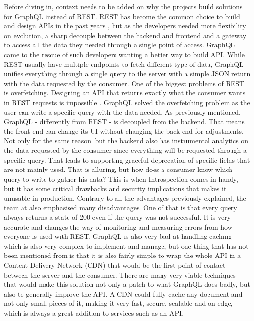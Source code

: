 Before diving in, context needs to be added on why the projects build solutions
for GraphQL instead of REST. REST has become the common choice to build and
design APIs in the past years \citep{britoRESTVsGraphQL2020}, but as the
developers needed more flexibility on evolution, a sharp decouple between the
backend and frontend and a gateway to access all the data they needed through a
single point of access. GraphQL came to the rescue of such developers wanting a
better way to build API. While REST usually have multiple endpoints to fetch
different type of data, GraphQL unifies everything through a single query to the
server with a simple JSON return with the data requested by the consumer. One of
the biggest problems of REST is overfetching. Designing an API that returns
exactly what the consumer wants in REST requests is impossible
\citep{seabraRESTGraphQLPerformance2019}. GraphQL solved the overfetching
problem as the user can write a specific query with the data needed. As
previously mentioned, GraphQL - differently from REST - is decoupled from the
backend. That means the front end can change its UI without changing the back
end for adjustments. Not only for the same reason, but the backend also has
instrumental analytics on the data requested by the consumer since everything
will be requested through a specific query. That leads to supporting graceful
deprecation of specific fields that are not mainly used. That is alluring, but
how does a consumer know which query to write to gather his data? This is when
Introspection comes in handy, but it has some critical drawbacks and security
implications that makes it unusable in production. Contrary to all the
advantages previously explained, the team at
\citet{stablekernelAdvantagesDisadvantagesGraphQL2021} also emphasised many
disadvantages. One of that is that every query always returns a state of 200
even if the query was not successful. It is very accurate and changes the way of
monitoring and measuring errors from how everyone is used with REST. GraphQL is
also very bad at handling caching which is also very complex to implement and
manage, but one thing that has not been mentioned from
\citet{stablekernelAdvantagesDisadvantagesGraphQL2021} is that it is also fairly
simple to wrap the whole API in a Content Delivery Network (CDN) that would be
the first point of contact between the server and the consumer. There are many
very viable techniques that would make this solution not only a patch to what
GraphQL does badly, but also to generally improve the API. A CDN could fully
cache any document and not only small pieces of it, making it very fast, secure,
scalable and on edge, which is always a great addition to services such as an
API.

